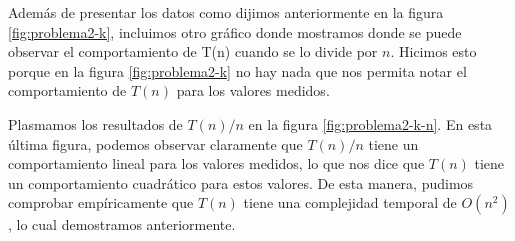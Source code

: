 Además de presentar los datos como dijimos anteriormente en la figura \ref{fig:problema2-k}, incluimos otro gráfico donde mostramos donde se puede observar el comportamiento de T(n) cuando se lo divide por $n$. Hicimos esto porque en la figura \ref{fig:problema2-k} no hay nada que nos permita notar el comportamiento de $T(n)$ para los valores medidos.

Plasmamos los resultados de $T(n)/n$ en la figura \ref{fig:problema2-k-n}. En esta última figura, podemos observar claramente que $T(n) / n$ tiene un comportamiento lineal para los valores medidos, lo que nos dice que $T(n)$ tiene un comportamiento cuadrático para estos valores. De esta manera, pudimos comprobar empíricamente que $T(n)$ tiene una complejidad temporal de $O(n^2)$, lo cual demostramos anteriormente.
